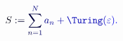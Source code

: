 \documentclass[12pt]{article}
\begin{document}
\makeatletter
\renewcommand*{\@textcolor}[3]{%
  \protect\leavevmode
  \begingroup
    \color#1{#2}#3%
  \endgroup
}
\makeatother
\begin{displaymath}
\mathcolor[RGB]{0,0,15}{S} \mathcolor[RGB]{0,0,30}{:} \mathcolor[RGB]{0,0,45}{=} \mathcolor[RGB]{0,0,60}{\sum} _ { \mathcolor[RGB]{0,0,75}{n} \mathcolor[RGB]{0,0,90}{=} \mathcolor[RGB]{0,0,105}{1} } ^ { \mathcolor[RGB]{0,0,120}{N} } \mathcolor[RGB]{0,0,135}{a} _ { \mathcolor[RGB]{0,0,150}{n} } \mathcolor[RGB]{0,0,165}{+} \mathcolor[RGB]{0,0,180}{\Turing} \mathcolor[RGB]{0,0,195}{(} \mathcolor[RGB]{0,0,210}{\varepsilon} \mathcolor[RGB]{0,0,225}{)} \mathcolor[RGB]{0,0,240}{.}
\end{displaymath}
\end{document}
